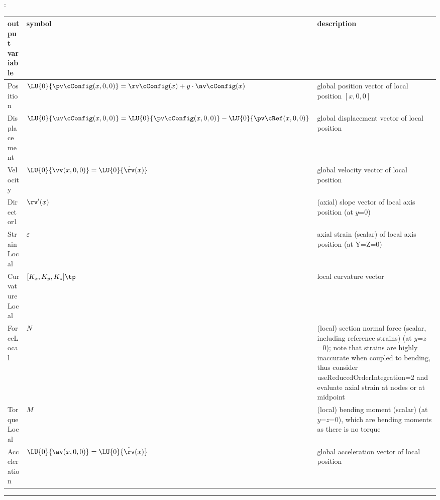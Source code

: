 :
\begin{center}
\footnotesize
\begin{longtable}{| p{5cm} | p{5cm} | p{6cm} |} 
\hline
\bf output variable & \bf symbol & \bf description \\ \hline
Position & $\LU{0}{\pv\cConfig(x,0,0)} = \rv\cConfig(x) + y\cdot \nv\cConfig(x)$ & global position vector of local position $[x,0,0]$\\ \hline
Displacement & $\LU{0}{\uv\cConfig(x,0,0)} = \LU{0}{\pv\cConfig(x,0,0)} - \LU{0}{\pv\cRef(x,0,0)}$ & global displacement vector of local position\\ \hline
Velocity & $\LU{0}{\vv(x,0,0)} = \LU{0}{\dot \rv(x)}$ & global velocity vector of local position\\ \hline
Director1 & $\rv'(x)$ & (axial) slope vector of local axis position (at $y$=0)\\ \hline
StrainLocal & $\varepsilon$ & axial strain (scalar) of local axis position (at Y=Z=0)\\ \hline
CurvatureLocal & $[K_x, K_y, K_z]\tp$ & local curvature vector\\ \hline
ForceLocal & $N$ &  (local) section normal force (scalar, including reference strains) (at $y$=$z$=0); note that strains are highly inaccurate when coupled to bending, thus consider useReducedOrderIntegration=2 and evaluate axial strain at nodes or at midpoint\\ \hline
TorqueLocal & $M$ &  (local) bending moment (scalar) (at $y$=$z$=0), which are bending moments as there is no torque\\ \hline
Acceleration & $\LU{0}{\av(x,0,0)} = \LU{0}{\ddot \rv(x)}$ & global acceleration vector of local position\\ \hline
\end{longtable}
\end{center}
 \noindent
\vspace{6pt}\par\noindent\rule{\textwidth}{0.4pt}
\label{miniExample_ObjectANCFCable}
\pythonstyle
